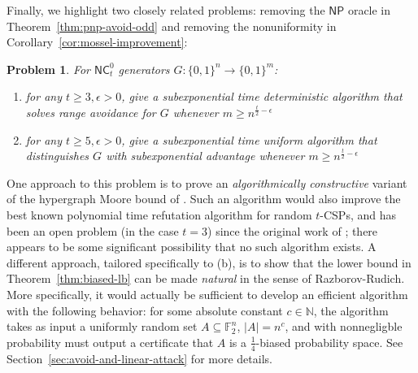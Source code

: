 \documentclass[11pt]{article}
\newtheorem{problem}{Problem}
\newcommand{\B}{\{0,1\}}
\begin{document}
Finally, we highlight two closely related problems: removing the $\mathsf{NP}$ oracle in Theorem~\ref{thm:pnp-avoid-odd} and removing the nonuniformity in Corollary~\ref{cor:mossel-improvement}:
\begin{problem}\label{prob:constructive-moore}
For $\mathsf{NC}^0_t$ generators $G:\B^n \to \B^m$:
\begin{enumerate}
    \item[(a)] for any $t\geq 3, \epsilon>0$, give a subexponential time deterministic algorithm that solves range avoidance for $G$ whenever $m \geq n^{\frac{t}{2} - \epsilon}$
    \item[(b)] for any $t \geq 5, \epsilon>0$, give a subexponential time uniform algorithm that distinguishes $G$ with subexponential advantage whenever $m \geq n^{\frac{t}{2}-\epsilon}$
\end{enumerate}
\end{problem}
One approach to this problem is to prove an \emph{algorithmically constructive} variant of the hypergraph Moore bound of \cite{smoothed,simpler-moore}. 
Such an algorithm would also improve the best known polynomial time refutation algorithm for random $t$-CSPs, and has been an open problem (in the case $t=3$) since the original work of \cite{FKO}; there appears to be some significant possibility that no such algorithm exists.
A different approach, tailored specifically to (b), is to show that the lower bound in Theorem~\ref{thm:biased-lb} can be made \emph{natural} in the sense of Razborov-Rudich. More specifically, it would actually be sufficient to develop an efficient algorithm with the following behavior: for some absolute constant $c \in\mathbb{N}$, the algorithm takes as input a uniformly random set $A \subseteq \mathbb{F}_2^n$, $|A|= n^c$, and with nonnegligble probability must output a certificate that $A$ is a $\frac{1}{4}$-biased probability space. See Section~\ref{sec:avoid-and-linear-attack} for more details.
\end{document}
